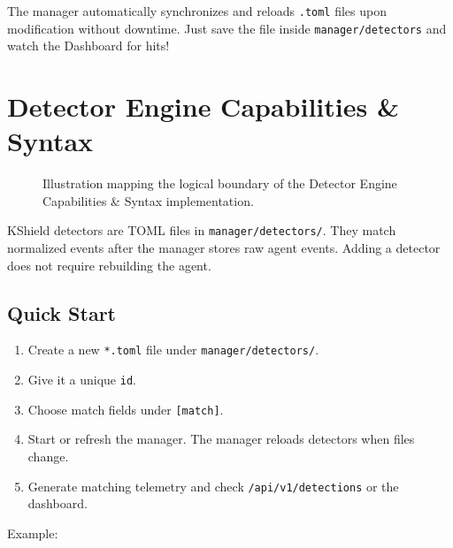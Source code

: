 \documentclass[
  12pt,
]{report}
\providecommand{\tightlist}{%
  \setlength{\itemsep}{0pt}\setlength{\parskip}{0pt}}
\begin{document}
The manager automatically synchronizes and reloads \texttt{.toml} files
upon modification without downtime. Just save the file inside
\texttt{manager/detectors} and watch the Dashboard for hits!

\clearpage

\chapter{Detector Engine Capabilities \&
Syntax}\label{detector-engine-capabilities-syntax}

\begin{figure}[h]
\centering
\vspace{5cm}
\caption{Illustration mapping the logical boundary of the Detector Engine Capabilities & Syntax implementation.}
\end{figure}

KShield detectors are TOML files in \texttt{manager/detectors/}. They
match normalized events after the manager stores raw agent events.
Adding a detector does not require rebuilding the agent.

\section{Quick Start}\label{quick-start}

\begin{enumerate}
\def\labelenumi{\arabic{enumi}.}
\tightlist
\item
  Create a new \texttt{*.toml} file under \texttt{manager/detectors/}.
\item
  Give it a unique \texttt{id}.
\item
  Choose match fields under \texttt{{[}match{]}}.
\item
  Start or refresh the manager. The manager reloads detectors when files
  change.
\item
  Generate matching telemetry and check \texttt{/api/v1/detections} or
  the dashboard.
\end{enumerate}

Example:
\end{document}
